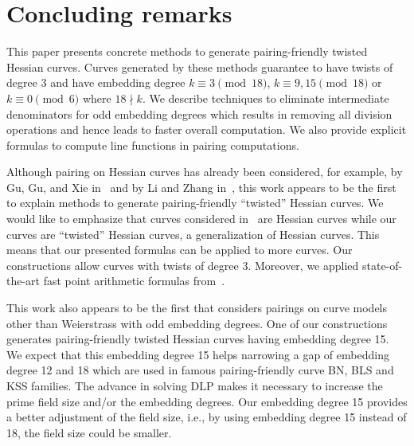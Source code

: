 \section{Concluding remarks}
\label{sec:conclude}


This paper presents concrete methods to generate pairing-friendly twisted Hessian curves.
Curves generated by these methods guarantee to have twists of degree $3$ and
have embedding degree
$k \equiv 3 \pmod{18}$,
$k \equiv 9,15 \pmod{18}$ or
$k \equiv 0 \pmod{6}$ where $18 \nmid k$.
We describe techniques to eliminate intermediate denominators for odd embedding degrees
which results in removing all division operations and hence leads to faster overall computation.
We also provide explicit formulas to compute line functions in pairing computations.

Although pairing on Hessian curves has already been considered,
for example, by Gu, Gu, and Xie in~\cite{2010/Gu} and by Li and Zhang in~\cite{2012/Li},
this work appears to be the first to explain methods to generate pairing-friendly ``twisted'' Hessian curves.
We would like to emphasize that curves considered in~\cite{2010/Gu} are Hessian curves
while our curves are ``twisted'' Hessian curves, a generalization of Hessian curves.
This means that our presented formulas can be applied to more curves.
Our constructions allow curves with twists of degree $3$.
Moreover, we applied state-of-the-art fast point arithmetic formulas from~\cite{2015/hessian}.

This work also appears to be the first that considers pairings on curve models other than Weierstrass with odd embedding degrees.
One of our constructions generates pairing-friendly twisted Hessian curves having embedding degree 15.
We expect that this embedding degree 15 helps narrowing a gap of embedding degree 12 and 18
which are used in famous pairing-friendly curve BN, BLS and KSS families.
The advance in solving DLP makes it necessary to increase the prime field size and/or the embedding degrees.
Our embedding degree 15 provides a better adjustment of the field size,
i.e., by using embedding degree 15 instead of 18, the field size could be smaller.

